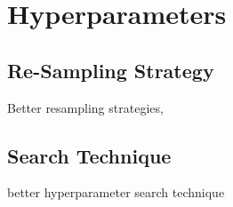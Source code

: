 \section{Hyperparameters}
\label{chp:future_work:sec:hyperparameters}

\subsection{Re-Sampling Strategy}
\label{chp:future_work:sec:hyperparameters:re_sampling_strategy}
Better resampling strategies,

\subsection{Search Technique}
\label{chp:future_work:sec:hyperparameters:search_technique}
better hyperparameter search technique
